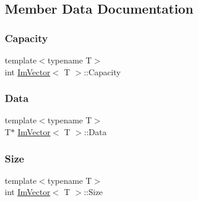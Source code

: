\subsection{Member Data Documentation}
\hypertarget{class_im_vector_abd24482b4d30d22e37582e521e5bfb33}{}\label{class_im_vector_abd24482b4d30d22e37582e521e5bfb33} 
\subsubsection{\texorpdfstring{Capacity}{Capacity}}
{\footnotesize\ttfamily template$<$typename T$>$ \\
int \hyperlink{class_im_vector}{Im\+Vector}$<$ T $>$\+::Capacity}

\hypertarget{class_im_vector_ac0e46e8b30cb079d93c8f0aad7d7cbd0}{}\label{class_im_vector_ac0e46e8b30cb079d93c8f0aad7d7cbd0} 
\subsubsection{\texorpdfstring{Data}{Data}}
{\footnotesize\ttfamily template$<$typename T$>$ \\
T$\ast$ \hyperlink{class_im_vector}{Im\+Vector}$<$ T $>$\+::Data}

\hypertarget{class_im_vector_abbfd157947f66280d27b21d70a16df8d}{}\label{class_im_vector_abbfd157947f66280d27b21d70a16df8d} 
\subsubsection{\texorpdfstring{Size}{Size}}
{\footnotesize\ttfamily template$<$typename T$>$ \\
int \hyperlink{class_im_vector}{Im\+Vector}$<$ T $>$\+::Size}

